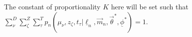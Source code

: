 \documentclass[12pt, onecolumn]{emulateapj}
\newcommand{\textul}{\underline}
\begin{document}
The constant of proportionality $K$ here will be set such that $\sum_{\nu}^{D}\sum_{\zeta}^{Z}\sum_{\tau}^{T} p_{n}(\mu_{\nu}, z_{\zeta}, t_{\tau} | \textul{\ell}_{n}, \vec{m}_{n}, \vec{\theta}^{*}, \textul{\phi}^{*})=1$.

%
%
%
%
%
%
%




\end{document}
